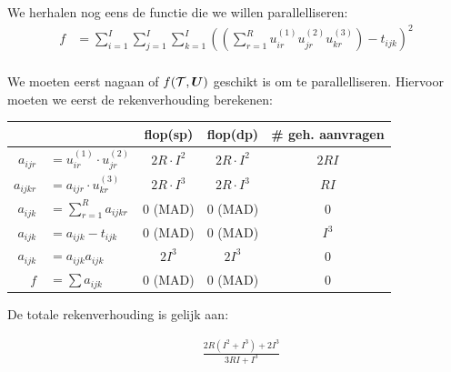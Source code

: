 We herhalen nog eens de functie die we willen parallelliseren:
\begin{align*}
	f &= \sum_{i = 1}^I \sum_{j = 1}^I \sum_{k = 1}^I \left( \left( \sum_{r=1}^{R} u^{(1)}_{i r} u^{(2)}_{j r} u^{(3)}_{k r} \right) - t_{ijk}\right)^2 \\
\end{align*}

We moeten eerst nagaan of $f(\mathcal{T}, \boldsymbol{U})$ geschikt is om te parallelliseren. Hiervoor moeten we eerst de rekenverhouding berekenen:\\
\begin{tabular}{|r l|c| c|c|}
\hline
					&							& flop(sp)			& flop(dp) 			& \# geh. aanvragen	\\
\hline
$a_{ij r} $	&$= u^{(1)}_{i r} \cdot%
u^{(2)}_{j r}$									& $2 R \cdot I^2$	& $2 R \cdot I^2$	&	$2RI$			\\
$a_{ijk r} $&$= a_{ij r} \cdot u^{(3)}_{k r}$	& $2 R \cdot I^3$	& $2 R \cdot I^3$	&	$RI$			\\
$a_{ijk} $	&$= \sum_{r=1}^{R} a_{ijk r}$		& 0 (MAD)			& 0 (MAD)			&	$0$				\\
\hline
$a_{ijk} $	&$= a_{ijk}  - t_{ijk}$				& 0 (MAD)			& 0 (MAD)			&	$I^3$			\\
$a_{ijk} $	&$= a_{ijk} a_{ijk}$				& $2 I^3$			& $2 I^3$			&	0				\\
$f $		&$= \sum a_{ijk}$					& 0 (MAD)			& 0 (MAD)			&	0				\\
\hline
\end{tabular}




De totale rekenverhouding is gelijk aan:

\begin{align*}
    & \frac{2R (I^2 + I^3) + 2I^3}{3RI + I^3}\\
\end{align*}

